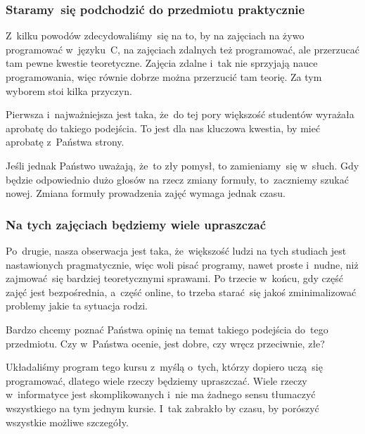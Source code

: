 \documentclass[10pt,t]{beamer}
\begin{document}
\begin{frame}
  \frametitle{Staramy~się podchodzić do przedmiotu praktycznie}


  Z~kilku powodów zdecydowaliśmy~się na to, by na zajęciach na żywo
  programować w~języku~C, na zajęciach zdalnych też programować, ale
  przerzucać tam pewne kwestie teoretyczne. Zajęcia zdalne i~tak nie
  sprzyjają nauce programowania, więc równie dobrze można przerzucić tam
  teorię. Za tym wyborem stoi kilka przyczyn.

  Pierwsza i~najważniejsza jest taka, że~do tej pory większość studentów
  wyrażała aprobatę do takiego podejścia. To jest dla nas kluczowa kwestia,
  by mieć aprobatę z~Państwa strony.

  Jeśli jednak Państwo uważają, że~to zły pomysł, to zamieniamy~się
  w~słuch. Gdy będzie odpowiednio dużo głosów na rzecz zmiany formuły,
  to~zaczniemy szukać nowej. Zmiana formuły prowadzenia zajęć wymaga jednak
  czasu.

\end{frame}





\begin{frame}
  \frametitle{Na tych zajęciach będziemy wiele upraszczać}


  Po~drugie, nasza obserwacja jest taka, że~większość ludzi na tych studiach
  jest nastawionych pragmatycznie, więc woli pisać programy, nawet proste
  i~nudne, niż zajmować~się bardziej teoretycznymi sprawami. Po trzecie
  w~końcu, gdy część zajęć jest bezpośrednia, a~część online, to trzeba
  starać~się jakoś zminimalizować problemy jakie ta sytuacja rodzi.

  Bardzo chcemy poznać Państwa opinię na temat takiego podejścia do~tego
  przedmiotu. Czy w~Państwa ocenie, jest dobre, czy wręcz przeciwnie, złe?

  Układaliśmy program tego kursu z~myślą o~tych, którzy dopiero uczą~się
  programować, dlatego wiele rzeczy będziemy \alert{upraszczać}. Wiele
  rzeczy w~informatyce jest skomplikowanych i~nie ma żadnego sensu tłumaczyć
  wszystkiego na tym jednym kursie. I~tak zabrakło by czasu, by porószyć
  wszystkie możliwe szczegóły.

\end{frame}
\end{document}
